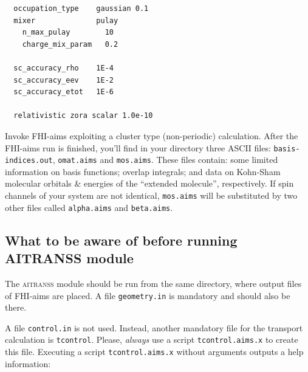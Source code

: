 \begin{verbatim}
  occupation_type    gaussian 0.1
  mixer              pulay
    n_max_pulay        10
    charge_mix_param   0.2

  sc_accuracy_rho    1E-4
  sc_accuracy_eev    1E-2
  sc_accuracy_etot   1E-6

  relativistic zora scalar 1.0e-10
\end{verbatim}

Invoke FHI-aims exploiting a cluster type (non-periodic)
calculation. After the FHI-aims run is finished, you'll find in your
directory three ASCII files: \verb,basis-indices.out,, \verb,omat.aims,
and \verb,mos.aims,. These files contain: some limited information on
basis functions; overlap integrals; and data on Kohn-Sham molecular
orbitals \& energies of the ``extended molecule'', respectively. If
spin channels of your system are not identical, \verb,mos.aims,
will be substituted by two other files called \verb,alpha.aims, and
\verb,beta.aims,.

\subsection[What to be aware of before running \textsc{aitranss} module]%
{What to be aware of before running {\normalsize AITRANSS} module} 
\label{subsec:aitranss:whattobeaware}

The \textsc{aitranss} module should be run from the same directory,
where output files of FHI-aims are placed.  A file \verb,geometry.in,
is mandatory and should also be there.

A file \verb,control.in, is not used. Instead, another mandatory file for
the transport calculation is \verb,tcontrol,.  Please, \textit{always} use
a script \verb,tcontrol.aims.x, to create this file.  Executing a script
\verb,tcontrol.aims.x, without arguments outputs a help information:

\clearpage

